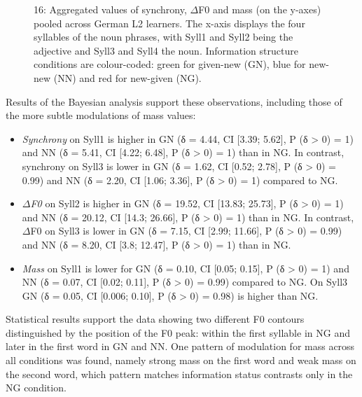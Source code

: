 \begin{stylecaption}\begin{figure}
\caption{16: Aggregated values of synchrony, ${\Delta}$F0 and mass (on the y-axes) pooled across German L2 learners. The x-axis displays the four syllables of the noun phrases, with Syll1 and Syll2 being the adjective and Syll3 and Syll4 the noun. Information structure conditions are colour-coded: green for given-new (GN), blue for new-new (NN) and red for new-given (NG).}
\label{fig:key:2}
\end{figure}\end{stylecaption}

Results of the Bayesian analysis support these observations, including those of the more subtle modulations of mass values:

\begin{itemize}
\item \textit{Synchrony} on Syll1 is higher in GN (δ = 4.44, CI [3.39; 5.62], P (δ > 0) = 1) and NN (δ = 5.41, CI [4.22; 6.48], P (δ > 0) = 1) than in NG. In contrast, synchrony on Syll3 is lower in GN (δ = 1.62, CI [0.52; 2.78], P (δ > 0) = 0.99) and NN (δ = 2.20, CI [1.06; 3.36], P (δ > 0) = 1) compared to NG.
\item \textit{${\Delta}$F0} on Syll2 is higher in GN (δ = 19.52, CI [13.83; 25.73], P (δ > 0) = 1) and NN (δ = 20.12, CI [14.3; 26.66], P (δ > 0) = 1) than in NG. In contrast, ${\Delta}$F0 on Syll3 is lower in GN (δ = 7.15, CI [2.99; 11.66], P (δ > 0) = 0.99) and NN (δ = 8.20, CI [3.8; 12.47], P (δ > 0) = 1) than in NG.
\item \textit{Mass} on Syll1 is lower for GN (δ = 0.10, CI [0.05; 0.15], P (δ > 0) = 1) and NN (δ = 0.07, CI [0.02; 0.11], P (δ > 0) = 0.99) compared to NG. On Syll3 GN (δ = 0.05, CI [0.006; 0.10], P (δ > 0) = 0.98) is higher than NG.
\end{itemize}

Statistical results support the data showing two different F0 contours distinguished by the position of the F0 peak: within the first syllable in NG and later in the first word in GN and NN. One pattern of modulation for mass across all conditions was found, namely strong mass on the first word and weak mass on the second word, which pattern matches information status contrasts only in the NG condition.

